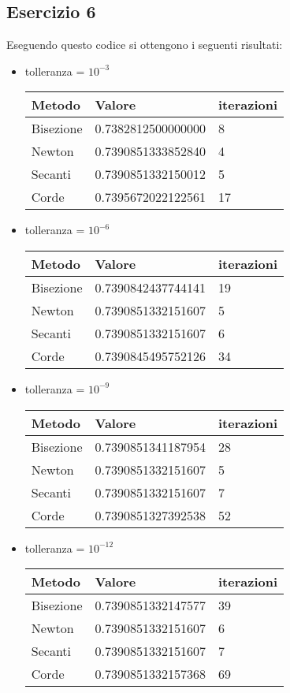 \subsection{Esercizio 6}

Eseguendo questo codice si ottengono i seguenti risultati:
\begin{itemize}
    \item tolleranza = $10^{-3}$
    \begin{tabular}{|l|l|l|}
        \hline
        Metodo & Valore & iterazioni \\
        \hline
        Bisezione &  0.7382812500000000 & 8\\
        Newton & 0.7390851333852840 & 4\\
        Secanti &  0.7390851332150012 & 5\\
        Corde & 0.7395672022122561 &  17\\
        \hline
    \end{tabular}
    \item tolleranza = $10^{-6}$
    \begin{tabular}{|l|l|l|}
        \hline
        Metodo & Valore & iterazioni \\
        \hline
        Bisezione &  0.7390842437744141 & 19\\
        Newton & 0.7390851332151607 &  5\\
        Secanti &  0.7390851332151607 & 6\\
        Corde &  0.7390845495752126 &  34 \\
        \hline
    \end{tabular}
    \item tolleranza = $10^{-9}$
    \begin{tabular}{|l|l|l|}
        \hline
        Metodo & Valore & iterazioni \\
        \hline
        Bisezione & 0.7390851341187954 & 28\\
        Newton & 0.7390851332151607 &  5\\
        Secanti & 0.7390851332151607 & 7\\
        Corde &  0.7390851327392538 &  52 \\
        \hline
    \end{tabular}
    \item tolleranza = $10^{-12}$
    \begin{tabular}{|l|l|l|}
        \hline
        Metodo & Valore & iterazioni \\
        \hline
        Bisezione &  0.7390851332147577 & 39\\
        Newton &  0.7390851332151607 &  6\\
        Secanti &   0.7390851332151607 & 7\\
        Corde &   0.7390851332157368 &  69 \\
        \hline
    \end{tabular}
\end{itemize}